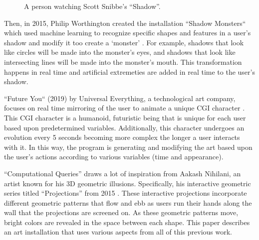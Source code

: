 \documentclass[10pt,twocolumn]{article}
\begin{document}
\begin{figure}[hbh]
\begin{center}
\vspace{.5cm}
\caption{A person watching Scott Snibbe's ``Shadow''. }
\label{fig:shadow-2002}
\end{center}
\end{figure} 

Then, in 2015, Philip Worthington created the installation ``Shadow Monsters`` which used machine learning to recognize specific shapes and features in a user's shadow and modify it too create a `monster' \cite{houston_public_media_mfah_2015}.  For example, shadows that look like circles will be made into the monster's eyes, and shadows that look like intersecting lines will be made into the monster's mouth.  This transformation happens in real time and artificial extremeties are added in real time to the user's shadow.

``Future You`` (2019) by Universal Everything, a technological art company, focuses on real time mirroring of the user to animate a unique CGI character \cite{noauthor_future_2019}. This CGI character is a humanoid, futuristic being that is unique for each user based upon predetermined variables. Additionally, this character undergoes an evolution every 5 seconds becoming more complex the longer a user interacts with it.  In this way, the program is generating and modifying the art based upon the user's actions according to various variables (time and appearance).  

``Computational Queries'' draws a lot of inspiration from Aakash Nihilani, an artist known for his 3D geometric illusions. Specifically, his interactive geometric series titled ``Projections'' from 2015 \cite{noauthor_aakash_nodate}.  These interactive projections incorporate different geometric patterns that flow and ebb as users run their hands along the wall that the projections are screened on. As these geometric patterns move, bright colors are revealed in the space between each shape.  This paper describes an art installation that uses various aspects from all of this previous work. 
\end{document}
